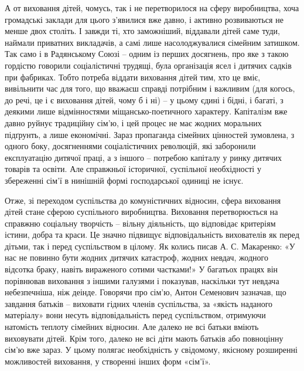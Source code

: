 \documentclass[12pt,a4paper,openany]{book}
\begin{document}
А от виховання дітей, чомусь, так і не перетворилося на сферу виробництва, хоча громадські заклади для цього з’явилися вже давно, і активно розвиваються не менше двох століть. І завжди ті, хто заможніший, віддавали дітей саме туди, наймали приватних викладачів, а самі лише насолоджувалися сімейним затишком. Так само і в Радянському Союзі – одним із перших досягнень, про яке з такою гордістю говорили соціалістичні трудящі, була організація ясел і дитячих садків при фабриках. Тобто потреба віддати виховання дітей тим, хто це вміє, вивільнити час для того, що вважаєш справді потрібним і важливим (для когось, до речі, це і є виховання дітей, чому б і ні) – у цьому єдині і бідні, і багаті, з деякими лише відмінностями міщансько-поетичного характеру. Капіталізм вже давно руйнує традиційну сім’ю, і цей процес не має жодних моральних підґрунть, а лише економічні. Зараз пропаганда сімейних цінностей зумовлена, з одного боку, досягненнями соціалістичних революцій, які заборонили експлуатацію дитячої праці, а з іншого – потребою капіталу у ринку дитячих товарів та освіти. Але справжньої історичної, суспільної необхідності у збереженні сім’ї в нинішній формі господарської одиниці не існує.

Отже, зі переходом суспільства до комуністичних відносин, сфера виховання дітей стане сферою суспільного виробництва. Виховання перетворюється на справжню соціальну творчість – вільну діяльність, що відповідає критеріям істини, добра та краси. Це значно підвищує відповідальність вихователів як перед дітьми, так і перед суспільством в цілому. Як колись писав А. С. Макаренко: «У нас не повинно бути жодних дитячих катастроф, жодних невдач, жодного відсотка браку, навіть вираженого сотими частками!» У багатьох працях він порівнював виховання з іншими галузями і показував, наскільки тут невдача небезпечніша, ніж деінде. Говорячи про сім’ю, Антон Семенович зазначав, що завдання батьків – виховати гідних членів суспільства, за «якість наданого матеріалу» вони несуть відповідальність перед суспільством, отримуючи натомість теплоту сімейних відносин. Але далеко не всі батьки вміють виховувати дітей. Крім того, далеко не всі діти мають батьків або повноцінну сім’ю вже зараз. У цьому полягає необхідність у свідомому, якісному розширенні можливостей виховання, у створенні інших форм «сім’ї».
\end{document}
